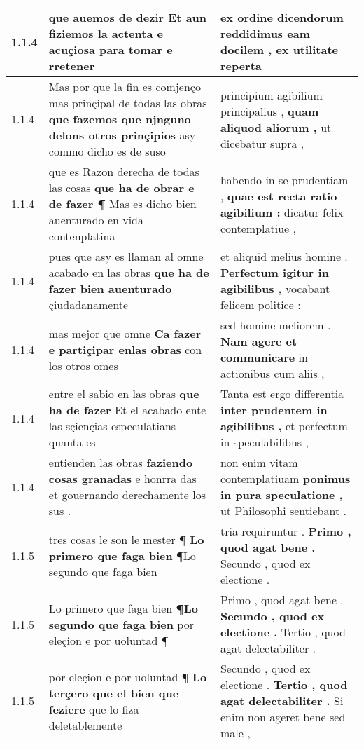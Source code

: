 \begin{tabular}{|p{1cm}|p{6.5cm}|p{6.5cm}|}
1.1.4 & que auemos de dezir \textbf{ Et aun fiziemos la actenta e acuçiosa } para tomar e rretener & ex ordine dicendorum \textbf{ reddidimus eam docilem , } ex utilitate reperta \\\hline
1.1.4 & Mas por que la fin es comjenço mas prinçipal de todas las obras \textbf{ que fazemos que njnguno delons otros prinçipios } asy commo dicho es de suso & principium agibilium principalius , \textbf{ quam aliquod aliorum , } ut dicebatur supra , \\\hline
1.1.4 & que es Razon derecha de todas las cosas \textbf{ que ha de obrar e de fazer ¶ } Mas es dicho bien auenturado en vida contenplatina & habendo in se prudentiam , \textbf{ quae est recta ratio agibilium : } dicatur felix contemplatiue , \\\hline
1.1.4 & pues que asy es llaman al omne acabado en las obras \textbf{ que ha de fazer bien auenturado } çiudadanamente & et aliquid melius homine . \textbf{ Perfectum igitur in agibilibus , } vocabant felicem politice : \\\hline
1.1.4 & mas mejor que omne \textbf{ Ca fazer e partiçipar enlas obras } con los otros omes & sed homine meliorem . \textbf{ Nam agere et communicare } in actionibus cum aliis , \\\hline
1.1.4 & entre el sabio en las obras \textbf{ que ha de fazer } Et el acabado ente las sçiençias especulatians quanta es & Tanta est ergo differentia \textbf{ inter prudentem in agibilibus , } et perfectum in speculabilibus , \\\hline
1.1.4 & entienden las obras \textbf{ faziendo cosas granadas } e honrra das et gouernando derechamente los sus . & non enim vitam contemplatiuam \textbf{ ponimus in pura speculatione , } ut Philosophi sentiebant . \\\hline
1.1.5 & tres cosas le son le mester ¶ \textbf{ Lo primero que faga bien } ¶Lo segundo que faga bien & tria requiruntur . \textbf{ Primo , quod agat bene . } Secundo , quod ex electione . \\\hline
1.1.5 & Lo primero que faga bien \textbf{ ¶Lo segundo que faga bien } por eleçion e por uoluntad ¶ & Primo , quod agat bene . \textbf{ Secundo , quod ex electione . } Tertio , quod agat delectabiliter . \\\hline
1.1.5 & por eleçion e por uoluntad ¶ \textbf{ Lo terçero que el bien que feziere } que lo fiza deletablemente & Secundo , quod ex electione . \textbf{ Tertio , quod agat delectabiliter . } Si enim non ageret bene sed male , \\\hline

\end{tabular}
